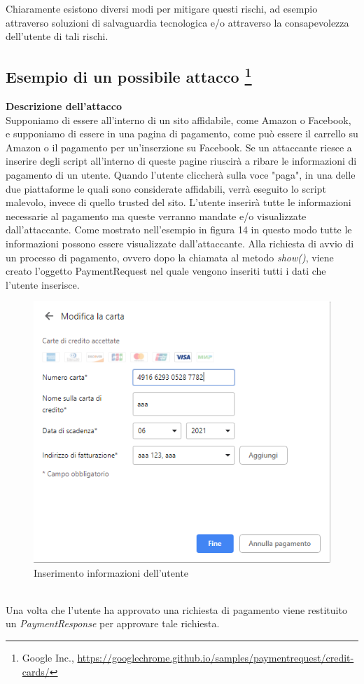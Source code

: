 \documentclass[11pt ,a4paper , twoside , openright ]{book}
\begin{document}
	Chiaramente esistono diversi modi per mitigare questi rischi, ad esempio attraverso soluzioni di salvaguardia tecnologica e/o attraverso la consapevolezza dell'utente di tali rischi.
	
	\subsection[Esempio di un possibile attacco]{Esempio di un possibile attacco \footnote{Google Inc., \url{https://googlechrome.github.io/samples/paymentrequest/credit-cards/}}} 
	\textbf{Descrizione dell'attacco}
	\\
	Supponiamo di essere all'interno di un sito affidabile, come Amazon o Facebook, e supponiamo di essere in una pagina di pagamento, come può essere il carrello su Amazon o il pagamento per un'inserzione su Facebook.
	Se un attaccante riesce a inserire degli script all'interno di queste pagine riuscirà a ribare le informazioni di pagamento di un utente.
	Quando l'utente cliccherà sulla voce "paga", in una delle due piattaforme le quali sono considerate affidabili, verrà eseguito lo script malevolo, invece di quello trusted del sito.
	L'utente inserirà tutte le informazioni necessarie al pagamento ma queste verranno mandate e/o visualizzate dall'attaccante.
	Come mostrato nell'esempio in figura 14 in questo modo tutte le informazioni possono essere visualizzate dall'attaccante.
	Alla richiesta di avvio di un processo di pagamento, ovvero dopo la chiamata al metodo \textit{show()}, viene creato l'oggetto PaymentRequest nel quale vengono inseriti tutti i dati che l'utente inserisce. 
	\begin{figure}[h]
		\centering
		\includegraphics[width=0.5\linewidth]{Chrome1}
		\caption{Inserimento informazioni dell'utente}
		\label{fig: Inserimento informazioni dell'utente}
	\end{figure}
	\\
	\pagebreak
	Una volta che l'utente ha approvato una richiesta di pagamento viene restituito un \textit{PaymentResponse} per approvare tale richiesta. 
\end{document}
